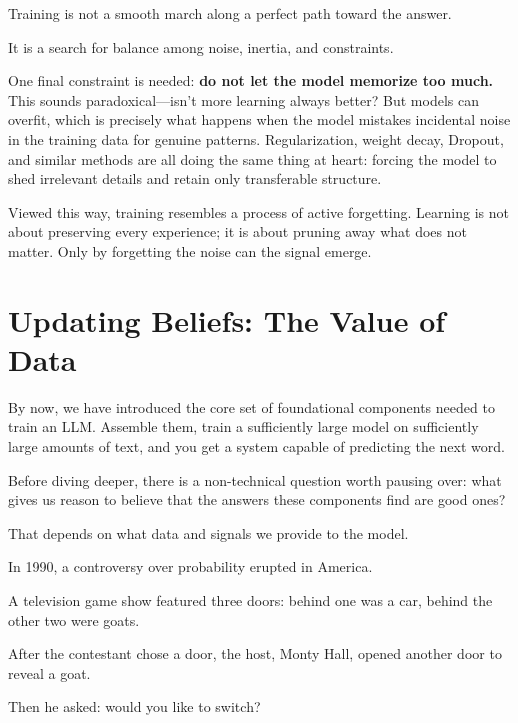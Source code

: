 \begin{importantbox}
Training is not a smooth march along a perfect path toward the answer.

It is a search for balance among noise, inertia, and constraints.
\end{importantbox}

One final constraint is needed: \textbf{do not let the model memorize too much.} This sounds paradoxical---isn't more learning always better? But models can overfit, which is precisely what happens when the model mistakes incidental noise in the training data for genuine patterns. Regularization, weight decay, Dropout, and similar methods are all doing the same thing at heart: forcing the model to shed irrelevant details and retain only transferable structure.

\vspace{1em}

Viewed this way, training resembles a process of active forgetting. Learning is not about preserving every experience; it is about pruning away what does not matter. Only by forgetting the noise can the signal emerge.

\newpage
\section{Updating Beliefs: The Value of Data}

By now, we have introduced the core set of foundational components needed to train an LLM. Assemble them, train a sufficiently large model on sufficiently large amounts of text, and you get a system capable of predicting the next word.

\vspace{1em}
Before diving deeper, there is a non-technical question worth pausing over: what gives us reason to believe that the answers these components find are good ones?

That depends on what data and signals we provide to the model.

\vspace{1em}

In 1990, a controversy over probability erupted in America.

A television game show featured three doors: behind one was a car, behind the other two were goats.

After the contestant chose a door, the host, Monty Hall, opened another door to reveal a goat.

Then he asked: would you like to switch?


